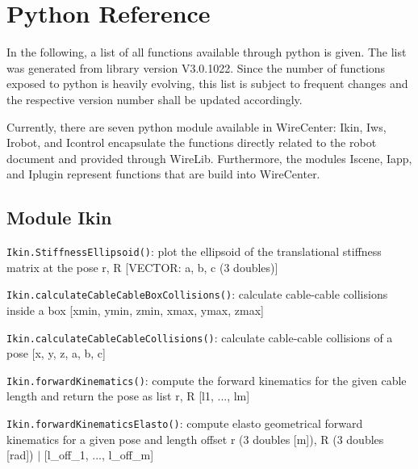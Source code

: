 \documentclass[11pt,a4paper,onepage,openany]{book}
\begin{document}
\section{Python Reference}\label{sec:Python}
In the following, a list of all functions available through python is given. 
The list was generated from library version V3.0.1022. Since the number of
functions exposed to python is heavily evolving, this list is subject to
frequent changes and the respective version number shall be updated
accordingly.

Currently, there are seven python module available in WireCenter: Ikin, Iws,
Irobot, and Icontrol encapsulate the functions directly related to the robot
document and provided through WireLib. Furthermore, the modules Iscene, Iapp,
and Iplugin represent functions that are build into WireCenter.


\subsection{Module Ikin }
\texttt{Ikin.StiffnessEllipsoid()}: plot the ellipsoid of the translational stiffness matrix at the pose r, R [VECTOR: a, b, c (3 doubles)]

\texttt{Ikin.calculateCableCableBoxCollisions()}: calculate cable-cable collisions inside a box [xmin, ymin, zmin, xmax, ymax, zmax]

\texttt{Ikin.calculateCableCableCollisions()}: calculate cable-cable collisions of a pose [x, y, z, a, b, c]

\texttt{Ikin.forwardKinematics()}: compute the forward kinematics for the given cable length and return the pose as list r, R [l1, ..., lm]

\texttt{Ikin.forwardKinematicsElasto()}: compute elasto geometrical forward kinematics for a given pose and length offset r (3 doubles [m]), R (3 doubles [rad]) $|$ [l\_off\_1, ..., l\_off\_m]
\end{document}
